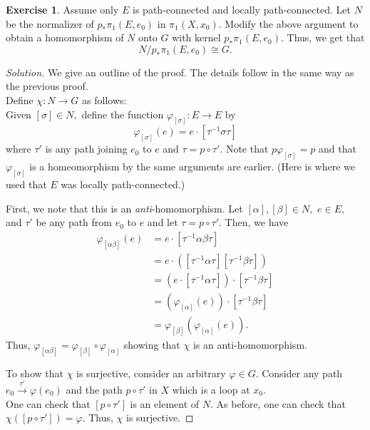 \documentclass[12pt]{article}
\theoremstyle{definition}
\numberwithin{thm}{section}
\newtheorem{exe}[thm]{Exercise}
\newenvironment{soln}{\begin{proof}[Solution]}{\end{proof}}
\begin{document}
\begin{exe}
	Assume only $E$ is path-connected and locally path-connected. Let $N$ be the normalizer of $p_*\pi_1(E, e_0)$ in $\pi_1(X, x_0).$ Modify the above argument to obtain a homomorphism of $N$ onto $G$ with kernel $p_*\pi_1(E, e_0).$ Thus, we get that
	\begin{equation*} 
		N/p_*\pi_1(E, e_0) \cong G.
	\end{equation*}
\end{exe}
\begin{soln}
	We give an outline of the proof. The details follow in the same way as the previous proof. \\
	Define $\chi:N \to G$ as follows:\\
	Given $[\sigma] \in N,$ define the function $\varphi_{[\sigma]}:E \to E$ by
	\begin{equation*} 
		\varphi_{[\sigma]}(e) = e\cdot[\tau^{-1}\sigma\tau]
	\end{equation*}
	where $\tau'$ is any path joining $e_0$ to $e$ and $\tau = p \circ \tau'.$ Note that $p\varphi_{[\sigma]} = p$ and that $\varphi_{[\sigma]}$ is a homeomorphism by the same arguments are earlier. (Here is where we used that $E$ was locally path-connected.) 

	First, we note that this is an \emph{anti}-homomorphism. Let $[\alpha], [\beta] \in N,$ $e \in E,$ and $\tau'$ be any path from $e_0$ to $e$ and let $\tau = p\circ\tau'.$ Then, we have
	\begin{align*} 
		\varphi_{[\alpha\beta]}(e) &= e\cdot[\tau^{-1}\alpha\beta\tau]\\
		&=e\cdot\left([\tau^{-1}\alpha\tau][\tau^{-1}\beta\tau]\right)\\
		&= (e\cdot[\tau^{-1}\alpha\tau])\cdot[\tau^{-1}\beta\tau]\\
		&= (\varphi_{[\alpha]}(e))\cdot[\tau^{-1}\beta\tau]\\
		&= \varphi_{[\beta]}(\varphi_{[\alpha]}(e)).
	\end{align*}
	Thus, $\varphi_{[\alpha\beta]} = \varphi_{[\beta]}\circ\varphi_{[\alpha]}$ showing that $\chi$ is an anti-homomorphism.

	To show that $\chi$ is surjective, consider an arbitrary $\varphi \in G.$ Consider any path $e_0\overset{\tau'}{\longrightarrow}\varphi(e_0)$ and the path $p\circ\tau'$ in $X$ which is a loop at $x_0.$\\
	One can check that $[p\circ\tau']$ is an element of $N.$ As before, one can check that $\chi([p\circ\tau']) = \varphi.$ Thus, $\chi$ is surjective.


\end{soln}
\end{document}
